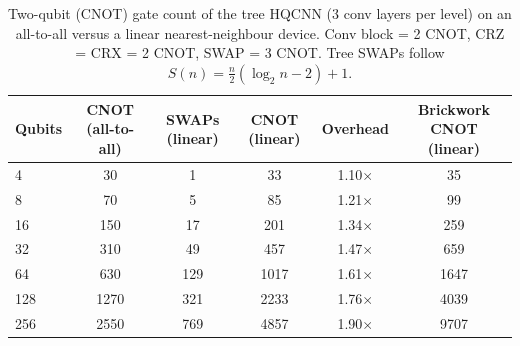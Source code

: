 \begin{table}[t]
\centering
\caption{Two-qubit (CNOT) gate count of the tree HQCNN (3 conv layers per level) on an all-to-all versus a linear nearest-neighbour device. Conv block = 2 CNOT, CRZ = CRX = 2 CNOT, SWAP = 3 CNOT. Tree SWAPs follow $S(n)=\tfrac{n}{2}(\log_2 n-2)+1$.}
\label{tab:v3_routing}
\small
\begin{tabular}{lccccc}
\toprule
Qubits & CNOT (all-to-all) & SWAPs (linear) & CNOT (linear) & Overhead & Brickwork CNOT (linear) \\
\midrule
4 & 30 & 1 & 33 & 1.10$\times$ & 35 \\
8 & 70 & 5 & 85 & 1.21$\times$ & 99 \\
16 & 150 & 17 & 201 & 1.34$\times$ & 259 \\
32 & 310 & 49 & 457 & 1.47$\times$ & 659 \\
64 & 630 & 129 & 1017 & 1.61$\times$ & 1647 \\
128 & 1270 & 321 & 2233 & 1.76$\times$ & 4039 \\
256 & 2550 & 769 & 4857 & 1.90$\times$ & 9707 \\
\bottomrule
\end{tabular}
\end{table}
